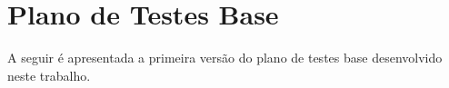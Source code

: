 \chapter{Plano de Testes Base} \label{app:plano-testes-base}

A seguir é apresentada a primeira versão do plano de testes base desenvolvido neste trabalho.




